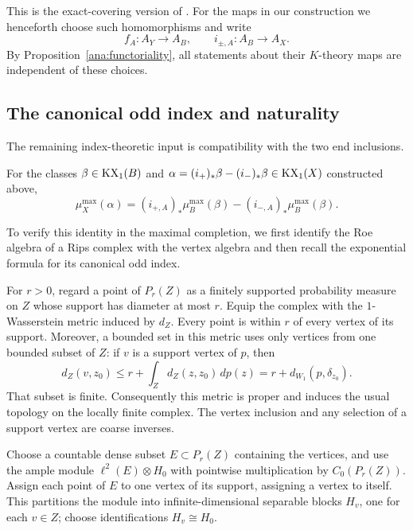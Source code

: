 This is the exact-covering version of \cite[Lemma~2.15]{OOY09}.  For the
maps in our construction we henceforth choose such homomorphisms and write
\[
 f_A:A_Y\longrightarrow A_B,\qquad
 i_{\pm,A}:A_B\longrightarrow A_X.
\]
By Proposition~\ref{ana:functoriality}, all statements about their
$K$-theory maps are independent of these choices.

\subsection{The canonical odd index and naturality}

The remaining index-theoretic input is compatibility with the two end
inclusions.

\begin{proposition}
\label{ana:naturality}
For the classes $\beta\in\operatorname{KX}_1(B)$ and
$\alpha=(i_+)_*\beta-(i_-)_*\beta\in\operatorname{KX}_1(X)$ constructed above,
\begin{equation}
 \label{eq:ana-naturality}
 \mu_X^{\max}(\alpha)
 =(i_{+,A})_*\mu_B^{\max}(\beta)
  -(i_{-,A})_*\mu_B^{\max}(\beta).
\end{equation}
\end{proposition}

To verify this identity in the maximal completion, we first identify the
Roe algebra of a Rips complex with the vertex algebra and then recall the
exponential formula for its canonical odd index.

For $r>0$, regard a point of $P_r(Z)$ as a finitely supported probability
measure on $Z$ whose support has diameter at most $r$.  Equip the complex
with the $1$-Wasserstein metric induced by $d_Z$.  Every point is within
$r$ of every vertex of its support.  Moreover, a bounded set in this
metric uses only vertices from one bounded subset of $Z$: if $v$ is a
support vertex of $p$, then
\[
 d_Z(v,z_0)\leq r+\int_Z d_Z(z,z_0)\,dp(z)
             =r+d_{W_1}(p,\delta_{z_0}).
\]
That subset is finite.  Consequently this metric is proper and induces
the usual topology on the locally finite complex.  The vertex inclusion
and any selection of a support vertex are coarse inverses.

Choose a countable dense subset $E\subset P_r(Z)$ containing the vertices,
and use the ample module $\ell^2(E)\otimes H_0$ with pointwise
multiplication by $C_0(P_r(Z))$.  Assign each point of $E$ to one vertex of
its support, assigning a vertex to itself.  This partitions the module
into infinite-dimensional separable blocks $H_v$, one for each $v\in Z$;
choose identifications $H_v\cong H_0$.

